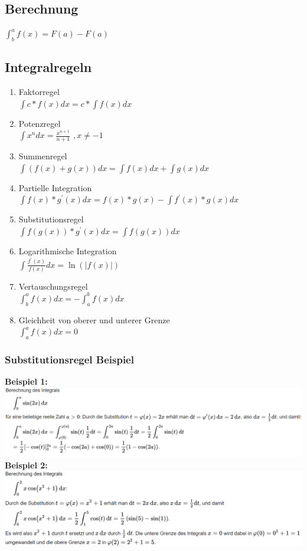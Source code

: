 \documentclass[12pt,a4paper]{article}
\begin{document}
	\subsection{Berechnung}
		$\int^a_b{f(x)} = F(a) - F(a)$

	\subsection{Integralregeln}
		\begin{enumerate}
			\item Faktorregel \\
				$\int {c*f(x)dx} = c * \int {f(x)dx}$
			\item Potenzregel\\
				$\int{x^n}dx = \frac{x^{n+1}}{n+1}$   $, x \ne -1$
			\item Summenregel \\
				$\int {(f(x) + g(x))dx} = \int{f(x)dx} + \int{g(x)dx}$ 
			\item Partielle Integration\\
				$\int{f(x)*g^{'}(x)dx} = f(x)*g(x) - \int{f^{'}(x)*g(x)dx}$
			\item Substitutionsregel \\ 
				$\int{f(g(x)) * g^{'}(x)dx} =\int{f(g(x))dx}$
			\item Logarithmische Integration\\
				$\int{\frac{f^{'}(x)}{f(x)}dx} = \ln{(|f(x)|)} $
			\item Vertauschungsregel \\
				$\int^a_b{f(x)dx} = - \int^b_a{f(x)dx}$
			\item Gleichheit von oberer und unterer Grenze \\
				$\int^a_a{f(x)dx} = 0$
		\end{enumerate}
		
		\subsubsection{Substitutionsregel Beispiel}
		\textbf{Beispiel 1:}\newline
		\includegraphics[scale=0.85]{Bilder/substitutionsregel1.PNG}\newline
		\textbf{Beispiel 2:}\newline
		\includegraphics[scale=0.65]{Bilder/substitutionsregel2.PNG}
	
\end{document}

